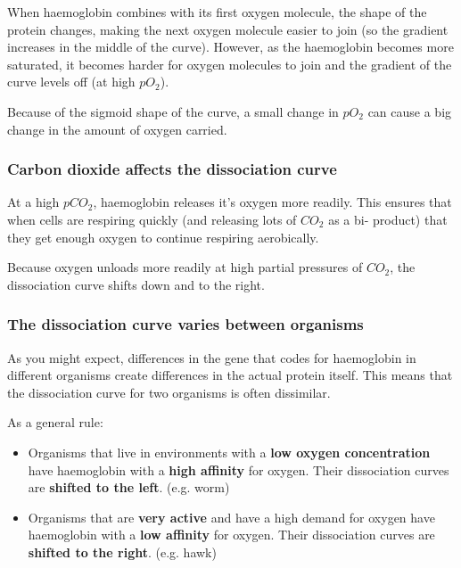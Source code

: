 \documentclass{article}
\begin{document}
When haemoglobin combines with its first oxygen molecule, the shape of the
protein changes, making the next oxygen molecule easier to join (so the gradient
increases in the middle of the curve). However, as the haemoglobin becomes more
saturated, it becomes harder for oxygen molecules to join and the gradient of
the curve levels off (at high $pO_2$).

Because of the sigmoid shape of the curve, a small change in $pO_2$ can cause a
big change in the amount of oxygen carried.

\subsubsection*{Carbon dioxide affects the dissociation curve}

 At a high $pCO_2$, haemoglobin
releases it's oxygen more readily. This ensures that when cells are respiring
quickly (and releasing lots of $CO_2$ as a bi- product) that they get enough
oxygen to continue respiring aerobically.

Because oxygen unloads more readily at high partial pressures of $CO_2$, the
dissociation curve shifts down and to the right.

\subsubsection*{The dissociation curve varies between organisms}

As you might expect, differences in the gene that codes for haemoglobin in
different organisms create differences in the actual protein itself. This means
that the dissociation curve for two organisms is often dissimilar.

As a general rule:

\begin{itemize}

	\item Organisms that live in environments with a {\bf low oxygen
	concentration} have haemoglobin with a {\bf high affinity} for oxygen.
	Their dissociation curves are {\bf shifted to the left}. (e.g. worm)

    \item Organisms that are {\bf very active} and have a high demand for oxygen
	have haemoglobin with a {\bf low affinity} for oxygen. Their dissociation
	curves are {\bf shifted to the right}. (e.g. hawk)

\end{itemize}
\end{document}
